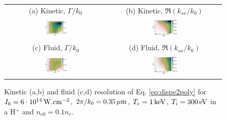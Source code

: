 \documentclass[
 reprint,
 superscriptaddress,
 amsmath,amssymb,
 aps,
]{revtex4-1}
\begin{document}
\begin{figure}
\begin{tabular}{cc}
(a) Kinetic, $\Gamma/k_0$ &
(b)  Kinetic, $\Re(k_{sx}/k_0)$ \\
\includegraphics[width=0.24\textwidth]{1a.png}&
\includegraphics[width=0.24\textwidth]{1b.png}\\
(c) Fluid, $\Gamma/k_0$  &
(d) Fluid, $\Re(k_{sx}/k_0)$  \\
\includegraphics[width=0.24\textwidth]{1c.png}&
\includegraphics[width=0.24\textwidth]{1d.png}
\end{tabular}
\caption{ \label{fig:dispe}  
Kinetic (a,b) and fluid (c,d) resolution of Eq. \eqref{eq:dispe2poly} for  $I_0 = 6\cdot 10^{14}\, \rm W.cm^{-2}$, $2\pi/k_0=0.35 \,\rm\mu m$, $T_e =1\,\rm  keV$, $ T_i=300\,  \rm eV$ in a H$^+$ and $n_{e0}=0.1n_c$.
 }
\end{figure}
\end{document}
